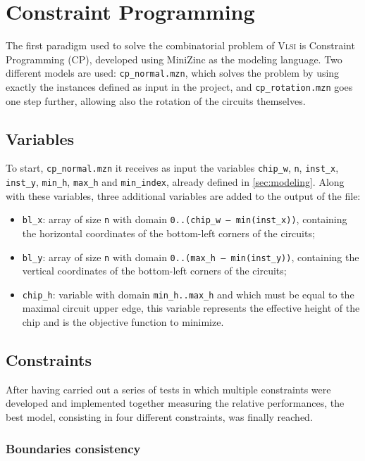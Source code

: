 \documentclass[a4paper, 12pt]{article}
\begin{document}
\section{Constraint Programming}\label{sec:cp}

The first paradigm used to solve the combinatorial problem of \textsc{Vlsi} is Constraint Programming (CP), developed using MiniZinc as the modeling language. Two different models are used: \verb|cp_normal.mzn|, which solves the problem by using exactly the instances defined as input in the project, and \verb|cp_rotation.mzn| goes one step further, allowing also the rotation of the circuits themselves.


\subsection{Variables}

To start, \verb|cp_normal.mzn| it receives as input the variables \verb|chip_w|, \verb|n|, \verb|inst_x|, \verb|inst_y|, \verb|min_h|, \verb|max_h| and \verb|min_index|, already defined in \cref{sec:modeling}. Along with these variables, three additional variables are added to the output of the file:
\begin{itemize}
    \item \verb|bl_x|: array of size \verb|n| with domain \verb|0..(chip_w – min(inst_x))|, containing the horizontal coordinates of the bottom-left corners of the circuits;
    \item \verb|bl_y|: array of size \verb|n| with domain \verb|0..(max_h – min(inst_y))|, containing the vertical coordinates of the bottom-left corners of the circuits;
    \item \verb|chip_h|: variable with domain \verb|min_h..max_h| and which must be equal to the maximal circuit upper edge, this variable represents the effective height of the chip and is the objective function to minimize.
\end{itemize}


\subsection{Constraints}

After having carried out a series of tests in which multiple constraints were developed and implemented together measuring the relative performances, the best model, consisting in four different constraints, was finally reached.


\subsubsection{Boundaries consistency}
\end{document}
